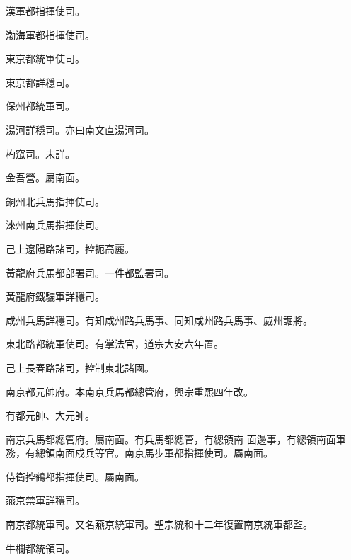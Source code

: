 \begin{pinyinscope}
 漢軍都指揮使司。



 渤海軍都指揮使司。



 東京都統軍使司。



 東京都詳穩司。



 保州都統軍司。



 湯河詳穩司。亦曰南文直湯河司。



 杓窊司。未詳。



 金吾營。屬南面。



 銅州北兵馬指揮使司。



 淶州南兵馬指揮使司。



 己上遼陽路諸司，控扼高麗。



 黃龍府兵馬都部署司。一件都監署司。



 黃龍府鐵驪軍詳穩司。



 咸州兵馬詳穩司。有知咸州路兵馬事、同知咸州路兵馬事、威州誳將。



 東北路都統軍使司。有掌法官，道宗大安六年置。



 己上長春路諸司，控制東北諸國。



 南京都元帥府。本南京兵馬都總管府，興宗重熙四年改。



 有都元帥、大元帥。



 南京兵馬都總管府。屬南面。有兵馬都總管，有總領南
 面邊事，有總領南面軍務，有總領南面戍兵等官。南京馬步軍都指揮使司。屬南面。



 侍衛控鶴都指揮使司。屬南面。



 燕京禁軍詳穩司。



 南京都統軍司。又名燕京統軍司。聖宗統和十二年復置南京統軍都監。



 牛欄都統領司。




\end{pinyinscope}
